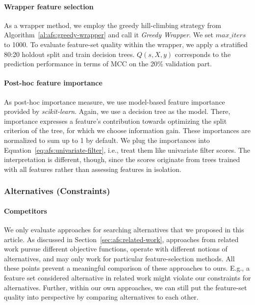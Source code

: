 \documentclass{article}
\theoremstyle{definition}
\begin{document}
\paragraph{Wrapper feature selection}

As a wrapper method, we employ the greedy hill-climbing strategy from Algorithm~\ref{al:afs:greedy-wrapper} and call it \emph{Greedy Wrapper}.
We set $max\_iters$ to 1000.
To evaluate feature-set quality within the wrapper, we apply a stratified 80:20 holdout split and train decision trees.
$Q(s,X,y)$ corresponds to the prediction performance in terms of MCC on the 20\% validation part.

\paragraph{Post-hoc feature importance}

As post-hoc importance measure, we use model-based feature importance provided by \emph{scikit-learn}.
Again, we use a decision tree as the model.
There, importance expresses a feature's contribution towards optimizing the split criterion of the tree, for which we choose information gain.
These importances are normalized to sum up to 1 by default.
We plug the importances into Equation~\ref{eq:afs:univariate-filter}, i.e., treat them like univariate filter scores.
The interpretation is different, though, since the scores originate from trees trained with all features rather than assessing features in isolation.

\subsubsection{Alternatives (Constraints)}
\label{sec:afs:experimental-design:approaches:alternatives}

\paragraph{Competitors}

We only evaluate approaches for searching alternatives that we proposed in this article.
As discussed in Section~\ref{sec:afs:related-work}, approaches from related work pursue different objective functions, operate with different notions of alternatives, and may only work for particular feature-selection methods.
All these points prevent a meaningful comparison of these approaches to ours.
E.g., a feature set considered alternative in related work might violate our constraints for alternatives.
Further, within our own approaches, we can still put the feature-set quality into perspective by comparing alternatives to each other.
\end{document}
